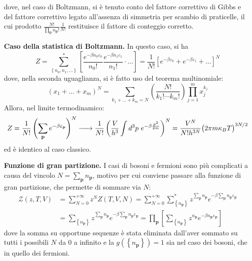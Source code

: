 \documentclass[11pt, a4paper]{scrartcl}
\theoremstyle{style}
\theoremstyle{style1}
\numberwithin{equation}{subsection}
\begin{document}
dove, nel caso di Boltzmann, si \`e tenuto conto del fattore correttivo di Gibbs e del fattore correttivo legato all'assenza di simmetria per scambio di praticelle, il cui prodotto $\frac{N!}{\prod_\mathbf{p} n_\mathbf{p} !} \frac{1}{N!}$ restituisce il fattore di conteggio corretto.
\vspace{.5cm}

\textbf{Caso della statistica di Boltzmann.} In questo caso, si ha
		\[
			Z = \sum_{\left\{ n_0,n_1,\ldots \right\} }^{*} \left[ \frac{e^{-\beta n_0 \varepsilon _0}}{n_0!} \frac{e^{-\beta n_1 \varepsilon _1}}{n_1!} \cdot \ldots \right] = \frac{1}{N!}\left[ e^{-\beta \varepsilon _0}+ e^{-\beta  \varepsilon _1}+ \ldots\right] ^N
		\] 
	dove, nella seconda uguaglianza, si \`e fatto uso del teorema multinomiale:
	\[
	\left(x_1+\ldots + x_m\right) ^N = \sum_{k_1+\ldots+k_m = N}^{} \left(\frac{N!}{k_1! \cdots k_m!}\right) \prod_{j=1} ^m x_j^{k_j}  
	\] 
	Allora, nel limite termodinamico:
	\[
		Z = \frac{1}{N!}\left(\sum_{\mathbf{p} }^{} e^{-\beta  \varepsilon _\mathbf{p} }\right) ^N \xrightarrow{\hspace{.5cm}} \frac{1}{N!}\left(\frac{V}{h^3}\int d^3 p \ e^{-\beta \frac{p^2}{2m}}\right) ^N = \frac{V^N}{N! h^{3N}} \big(2\pi m \kappa _B T\big) ^{3N / 2}
	\] 
	ed \`e identico al caso classico.
	\vspace{.5cm}

	\textbf{Funzione di gran partizione.} I casi di bosoni e fermioni sono pi\`u complicati a causa del vincolo $N = \sum_{\mathbf{p} }^{} n_\mathbf{p} $, motivo per cui conviene passare alla funzione di gran partizione, che permette di sommare via $N$:
	\[
		\begin{split}
			\mathcal{Z} (z,T,V) &= \sum_{N=0}^{+\infty} z^N Z(T,V,N) = \sum_{N=0}^{+\infty} \sum_{\left\{ n_\mathbf{p}  \right\} }^{*} z ^{\sum_{\mathbf{p} }^{} n_\mathbf{p} } e^{-\beta  \sum_{\mathbf{p}}^{} n_\mathbf{p} \varepsilon _\mathbf{p} }\\
					    &= \sum_{\left\{ n_\mathbf{p}  \right\} }^{} z^{\sum_{\mathbf{p} }^{} n_\mathbf{p} } e^{-\beta  \sum_{\mathbf{p} }^{} n_\mathbf{p} \varepsilon _\mathbf{p} } = \prod_\mathbf{p} \left[ \sum_{\left\{ n_\mathbf{p}  \right\} }^{} z^{n_\mathbf{p} }e^{-\beta n_\mathbf{p} \varepsilon _\mathbf{p} } \right] 
		\end{split}
	\] 
dove la somma su opportune sequenze \`e stata eliminata dall'aver sommato su tutti i possibili $N$ da $0$ a infinito e la $g\left(\left\{ n_\mathbf{p}  \right\} \right) = 1$ sia nel caso dei bosoni, che in quello dei fermioni.
\vspace{.5cm}
\end{document}
